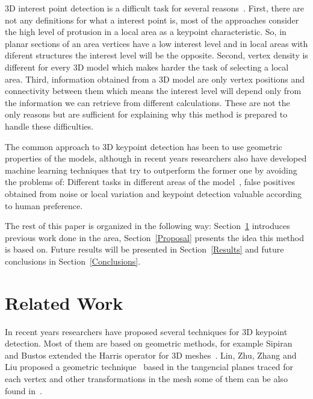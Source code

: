 \documentclass{comjnl}
\begin{document}
3D interest point detection is a difficult task for several reasons~\cite{Discrim, harris3D}. 
First, there are not any definitions for what a interest point is, 
most of the approaches consider the high level of protusion in a local
area as a keypoint characteristic. So, in planar sections of an area
vertices have a low interest level and in local areas with diferent
structures the interest level will be the opposite. Second, vertex 
density is different for every 3D model which makes harder the task of
selecting a local area. Third, information obtained from a 3D model
are only vertex positions and connectivity between them which means
the interest level will depend only from the information we can
retrieve from different calculations. These are not the only reasons
but are sufficient for explaining why this method is prepared to
handle these difficulties. 

The common approach to 3D keypoint detection has been to use 
geometric properties of the models, although in recent years researchers
also have developed machine learning techniques that try to outperform the
former one by avoiding the problems of: Different tasks in different areas
of the model~\cite{DNN}, false positives obtained from noise or local
variation and keypoint detection valuable according to human preference. 

The rest of this paper is organized in the following way:
Section~\ref{RelatedWork} introduces previous work done in the area,
Section~\ref{Proposal} presents the idea this method is based on. Future
results will be presented in Section~\ref{Results} and future conclusions
in Section~\ref{Conclusions}.

\section{Related Work} \label{RelatedWork}
In recent years researchers have proposed several techniques for
3D keypoint detection. Most of them are based on geometric methods, for
example Sipiran and Bustos extended the Harris operator for 3D
meshes~\cite{harris3D}. Lin, Zhu, Zhang and Liu proposed a geometric
technique~\cite{GMSR} based in the tangencial planes traced for each vertex and
other transformations in the mesh some of them can be also found
in~\cite{DNN}. 
\end{document}
